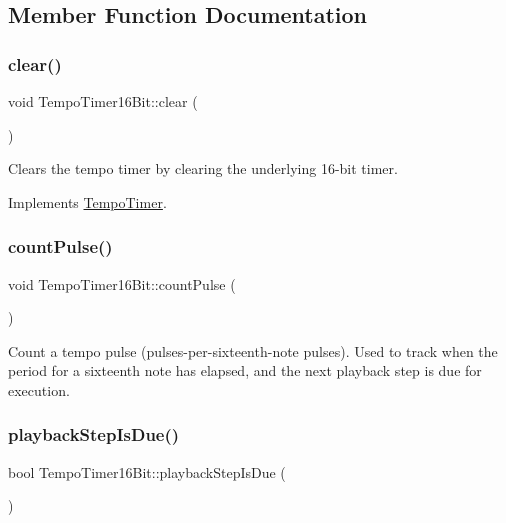 \subsection{Member Function Documentation}
\mbox{\label{class_tempo_timer16_bit_a749e01b62ff3ff184c62a99db70588ba}} 
\subsubsection{\texorpdfstring{clear()}{clear()}}
{\footnotesize\ttfamily void Tempo\+Timer16\+Bit\+::clear (\begin{DoxyParamCaption}{ }\end{DoxyParamCaption})\hspace{0.3cm}{\ttfamily [virtual]}}

Clears the tempo timer by clearing the underlying 16-\/bit timer. 

Implements \mbox{\hyperlink{class_tempo_timer}{Tempo\+Timer}}.

\mbox{\label{class_tempo_timer16_bit_a1dcf447b3ffdeadfc65f8bd3da24c632}} 
\subsubsection{\texorpdfstring{count\+Pulse()}{countPulse()}}
{\footnotesize\ttfamily void Tempo\+Timer16\+Bit\+::count\+Pulse (\begin{DoxyParamCaption}{ }\end{DoxyParamCaption})}

Count a tempo pulse (pulses-\/per-\/sixteenth-\/note pulses). Used to track when the period for a sixteenth note has elapsed, and the next playback step is due for execution. \mbox{\label{class_tempo_timer16_bit_a480d726dc86d7136904056ac4b37082b}} 
\subsubsection{\texorpdfstring{playback\+Step\+Is\+Due()}{playbackStepIsDue()}}
{\footnotesize\ttfamily bool Tempo\+Timer16\+Bit\+::playback\+Step\+Is\+Due (\begin{DoxyParamCaption}{ }\end{DoxyParamCaption})\hspace{0.3cm}{\ttfamily [virtual]}}

